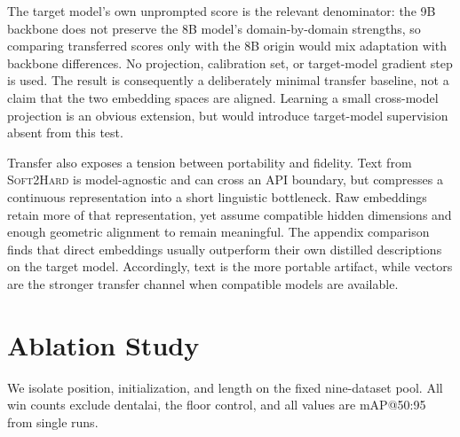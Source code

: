 \documentclass{article}
\newcommand{\distill}{\textsc{Soft2Hard}}
\begin{document}
The target model's own unprompted score is the relevant denominator: the 9B
backbone does not preserve the 8B model's domain-by-domain strengths, so
comparing transferred scores only with the 8B origin would mix adaptation with
backbone differences. No projection, calibration set, or target-model gradient
step is used. The result is consequently a deliberately minimal transfer
baseline, not a claim that the two embedding spaces are aligned. Learning a
small cross-model projection is an obvious extension, but would introduce
target-model supervision absent from this test.

Transfer also exposes a tension between portability and fidelity. Text from
\distill{} is model-agnostic and can cross an API boundary, but compresses a
continuous representation into a short linguistic bottleneck. Raw embeddings
retain more of that representation, yet assume compatible hidden dimensions
and enough geometric alignment to remain meaningful. The appendix comparison
finds that direct embeddings usually outperform their own distilled
descriptions on the target model. Accordingly, text is the more portable
artifact, while vectors are the stronger transfer channel when compatible
models are available.

\section{Ablation Study}
\label{sec:ablations}

We isolate position, initialization, and length on the fixed nine-dataset pool.
All win counts exclude dentalai, the floor control, and all values are
mAP@50:95 from single runs.
\end{document}
